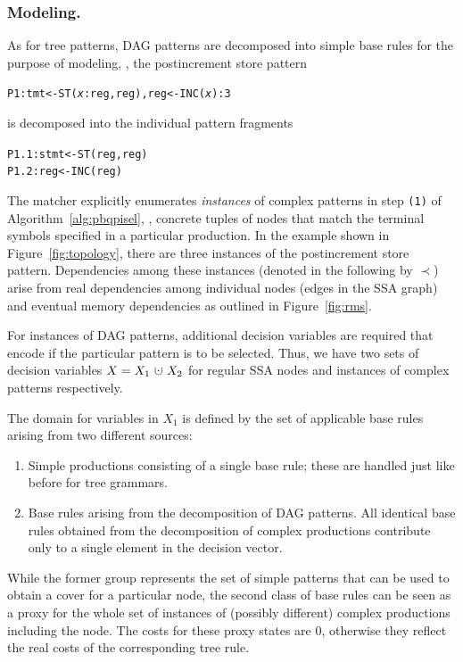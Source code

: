 \subsubsection{Modeling.}
As for tree patterns, DAG patterns are decomposed into simple base
rules for the purpose of modeling, \eg, the postincrement store
pattern
\begin{alltt}
  P1: tmt <- ST(\textit{x}:reg, reg), reg <- INC(\textit{x}) : 3
\end{alltt}
is decomposed into the individual pattern fragments
\begin{alltt}
  P1.1: stmt <- ST(reg, reg)
  P1.2: reg  <- INC(reg)
\end{alltt}
The matcher explicitly enumerates \emph{instances\/} of complex
patterns in step \texttt{(1)} of Algorithm~\ref{alg:pbqpisel}, \ie,
concrete tuples of nodes that match the terminal symbols specified in
a particular production. In the example shown in
Figure~\ref{fig:topology}, there are three instances of the
postincrement store pattern. Dependencies among these instances
(denoted in the following by $\prec$) arise from real dependencies
among individual nodes (edges in the SSA graph) and eventual memory
dependencies as outlined in Figure~\ref{fig:rms}.

For instances of DAG patterns, additional decision variables are
required that encode if the particular pattern is to be
selected. Thus, we have two sets of decision variables
$X=X_1~\dotcup~X_2$ for regular SSA nodes and instances of complex
patterns respectively.

The domain for variables in $X_1$ is defined by the set of applicable
base rules arising from two different sources:
\begin{enumerate}
\item Simple productions consisting of a single base rule; these are
  handled just like before for tree grammars.
\item Base rules arising from the decomposition of DAG patterns. All
  identical base rules obtained from the decomposition of complex
  productions contribute only to a single element in the decision
  vector.
\end{enumerate}
While the former group represents the set of simple patterns that can
be used to obtain a cover for a particular node, the second class of
base rules can be seen as a proxy for the whole set of instances of
(possibly different) complex productions including the node. The
costs for these proxy states are $0$, otherwise they reflect the
real costs of the corresponding tree rule.

